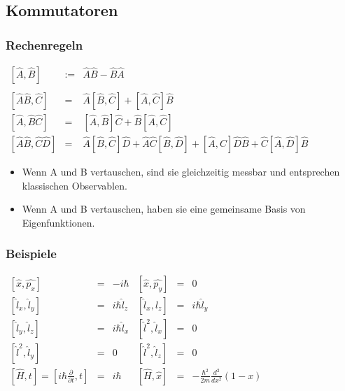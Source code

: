\subsection{Kommutatoren}
\subsubsection{Rechenregeln}
$
\begin{array}{rcl}

\left[ \hat{A}, \hat{B} \right]			& := 	&\hat{A}\hat{B} - \hat{B}\hat{A}\\\\
\left[ \hat{A}\hat{B}, \hat{C}\right]		& = 	&\hat{A} \left[\hat{B}, \hat{C} \right] + \left[ \hat{A},\hat{C} \right] \hat{B}\\
\left[ \hat{A}, \hat{B}\hat{C}\right]		& =	&\left[\hat{A},\hat{B} \right] \hat{C} + \hat{B} \left[\hat{A},\hat{C}\right]\\
\left[ \hat{A}\hat{B},\hat{C}\hat{D} \right]	& = 	&\hat{A} \left[\hat{B},\hat{C} \right] \hat{D} + \hat{A}\hat{C} \left[\hat{B},\hat{D} \right] + \left[\hat{A},\hat{C} \right] \hat{D}\hat{B} + \hat{C} \left[\hat{A},\hat{D} \right] \hat{B}

\end{array}
$
\begin{itemize}
	\item Wenn A und B vertauschen, sind sie gleichzeitig messbar und entsprechen klassischen Observablen.
	\item Wenn A und B vertauschen, haben sie eine gemeinsame Basis von Eigenfunktionen.
\end{itemize}

\subsubsection{Beispiele}
$
\begin{array}{rclrcl}
\left[\hat{x},\hat{p_x} \right]	& =	& -i\hbar	& \left[\hat{x},\hat{p_y} \right]	& =	& 0\\
\left[\hat{l}_x, \hat{l}_y\right] 		& = 	& i\hbar \hat{l}_z	& \left[\hat{l}_x, \hat{l}_z\right]	& =	& i\hbar \hat{l}_y\\
\left[\hat{l}_y, \hat{l}_z\right]		& =	& i\hbar \hat{l}_x	& \left[\hat{l}^2, \hat{l}_x \right]	& =	& 0\\
\left[\hat{l}^2, \hat{l}_y\right]		& =	& 0			& \left[\hat{l}^2, \hat{l}_z\right]	& =	& 0\\
\left[\hat{H},t \right] = \left[i\hbar \frac{\partial}{\partial t}, t\right]	& =	& i\hbar	&
\left[\hat{H},\hat{x}\right]	& = 	& -\frac{\hbar^2}{2m} \frac{d^2}{dx^2}(1-x)
\end{array}
$